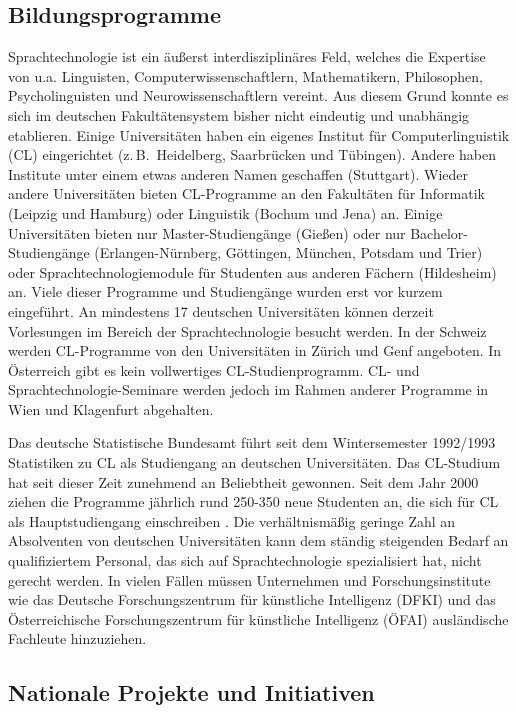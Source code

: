 \documentclass[]{../../metanetpaper}
\begin{document}
\begin{multicols}{2}
\subsection{Bildungsprogramme}

Sprachtechnologie ist ein äußerst interdisziplinäres Feld, welches die Expertise von u.a. Linguisten, Computerwissenschaftlern, Mathematikern, Philosophen, Psycholinguisten und Neurowissenschaftlern vereint. Aus diesem Grund konnte es sich im deutschen Fakultätensystem bisher nicht eindeutig und unabhängig etablieren. Einige Universitäten haben ein eigenes Institut für Computerlinguistik (CL) eingerichtet (z.\,B.~Heidelberg, Saarbrücken und Tübingen). Andere haben Institute unter einem etwas anderen Namen geschaffen (Stuttgart). Wieder andere Universitäten bieten CL-Programme an den Fakultäten für Informatik (Leipzig und Hamburg) oder Linguistik (Bochum und Jena) an. Einige Universitäten bieten nur Master-Studiengänge (Gießen) oder nur Bachelor-Studiengänge (Erlangen-Nürnberg, Göttingen, München, Potsdam und Trier) oder Sprachtechnologiemodule für Studenten aus anderen Fächern (Hildesheim) an. Viele dieser Programme und Studiengänge wurden erst vor kurzem eingeführt. An mindestens 17 deutschen Universitäten können derzeit Vorlesungen im Bereich der Sprachtechnologie besucht werden. In der Schweiz werden CL-Programme von den Universitäten in Zürich und Genf angeboten. In Österreich gibt es kein vollwertiges CL-Studienprogramm. CL- und Sprachtechnologie-Seminare werden jedoch im Rahmen anderer Programme in Wien und Klagenfurt abgehalten.

Das deutsche Statistische Bundesamt führt seit dem Wintersemester 1992/1993 Statistiken zu CL als Studiengang an deutschen Universitäten. Das CL-Studium hat seit dieser Zeit zunehmend an Beliebtheit gewonnen. Seit dem Jahr 2000 ziehen die Programme jährlich rund 250-350 neue Studenten an, die sich für CL als Hauptstudiengang einschreiben \cite{wie1}. Die verhältnismäßig geringe Zahl an Absolventen von deutschen Universitäten kann dem ständig steigenden Bedarf an qualifiziertem Personal, das sich auf Sprachtechnologie spezialisiert hat, nicht gerecht werden. In vielen Fällen müssen Unternehmen und Forschungsinstitute wie das Deutsche Forschungszentrum für künstliche Intelligenz (DFKI) und das Österreichische Forschungszentrum für künstliche Intelligenz (ÖFAI) ausländische Fachleute hinzuziehen.

\subsection{Nationale Projekte und Initiativen}


\end{multicols}
\end{document}
